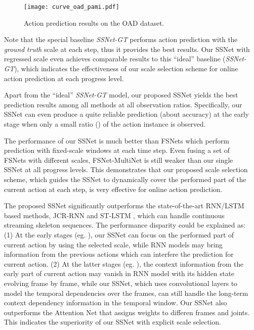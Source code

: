 \documentclass[10pt,twocolumn,letterpaper]{article}
\begin{document}
\begin{figure}[htbp]
		\centering
		\centerline{\texttt{[image: curve\_oad\_pami.pdf]}}
	\caption{Action prediction results on the OAD dataset.}
	\label{fig:result_curves_OAD}
\end{figure}


Note that the special baseline \emph{SSNet-GT} performs action prediction with the \emph{ground truth} scale at each step, thus it provides the best results.
Our SSNet with regressed scale even achieves comparable results to this ``ideal'' baseline (\emph{SSNet-GT}),
which indicates the effectiveness of our scale selection scheme for online action prediction at each progress level.

Apart from the ``ideal'' \emph{SSNet-GT} model,
our proposed SSNet yields the best prediction results among all methods at all observation ratios.
Specifically, our SSNet can even produce a quite reliable prediction (about  accuracy) at the early stage when only a small ratio () of the action instance is observed.





The performance of our SSNet is much better than FSNets which perform prediction with fixed-scale windows at each time step.
Even fusing a set of FSNets with different scales,
FSNet-MultiNet is still weaker than our single SSNet at all progress levels.
This demonstrates that our proposed scale selection scheme,
which guides the SSNet to dynamically cover the performed part of the current action at each step,
is very effective for online action prediction.


The proposed SSNet significantly outperforms the state-of-the-art RNN/LSTM based methods, JCR-RNN \cite{li2016online} and ST-LSTM \cite{liu2017PAMI},
which can handle continuous streaming skeleton sequences. The performance disparity could be explained as:
(1) At the early stages (eg. ), our SSNet can focus on the performed part of current action by using the selected scale,
while RNN models \cite{li2016online,liu2017PAMI} may bring information from the previous actions which can interfere the prediction for current action.
(2) At the latter stages (eg. ), the context information from the early part of current action may vanish in RNN model with its hidden state evolving frame by frame,
while our SSNet, which uses convolutional layers to model the temporal dependencies over the frames, can still handle the long-term context dependency information in the temporal window.
Our SSNet also outperforms the Attention Net \cite{liu2017global} that assigns weights to differen frames and joints.
This indicates the superiority of our SSNet with explicit scale selection.
\end{document}
